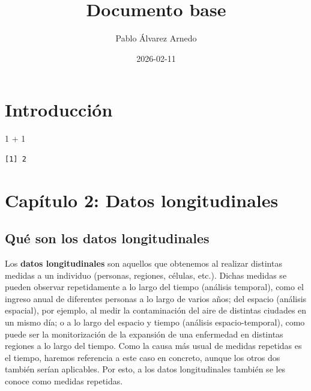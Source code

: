 \documentclass[
  letterpaper,
  DIV=11,
  numbers=noendperiod]{scrreprt}
\title{Documento base}
\author{Pablo Álvarez Arnedo}
\date{2026-02-11}
\newenvironment{Shaded}{\begin{snugshade}}{\end{snugshade}}
\newcommand{\DecValTok}[1]{\textcolor[rgb]{0.68,0.00,0.00}{#1}}
\newcommand{\SpecialCharTok}[1]{\textcolor[rgb]{0.37,0.37,0.37}{#1}}
\renewcommand*\contentsname{Table of contents}
\newcommand\contentsname{Table of contents}
\begin{document}
\maketitle

\renewcommand*\contentsname{Contenido}
{
\hypersetup{linkcolor=}
\setcounter{tocdepth}{1}
\tableofcontents
}

\chapter{Introducción}\label{introducciuxf3n}

\begin{Shaded}
\begin{Highlighting}[]
\DecValTok{1} \SpecialCharTok{+} \DecValTok{1}
\end{Highlighting}
\end{Shaded}

\begin{verbatim}
[1] 2
\end{verbatim}


\chapter{Capítulo 2: Datos
longitudinales}\label{capuxedtulo-2-datos-longitudinales}

\section{Qué son los datos
longitudinales}\label{quuxe9-son-los-datos-longitudinales}

Los \textbf{datos longitudinales} son aquellos que obtenemos al realizar
distintas medidas a un individuo (personas, regiones, células, etc.).
Dichas medidas se pueden observar repetidamente a lo largo del tiempo
(análisis temporal), como el ingreso anual de diferentes personas a lo
largo de varios años; del espacio (análisis espacial), por ejemplo, al
medir la contaminación del aire de distintas ciudades en un mismo día; o
a lo largo del espacio y tiempo (análisis espacio-temporal), como puede
ser la monitorización de la expansión de una enfermedad en distintas
regiones a lo largo del tiempo. Como la causa más usual de medidas
repetidas es el tiempo, haremos referencia a este caso en concreto,
aunque los otros dos también serían aplicables. Por esto, a los datos
longitudinales también se les conoce como medidas repetidas.
\end{document}
